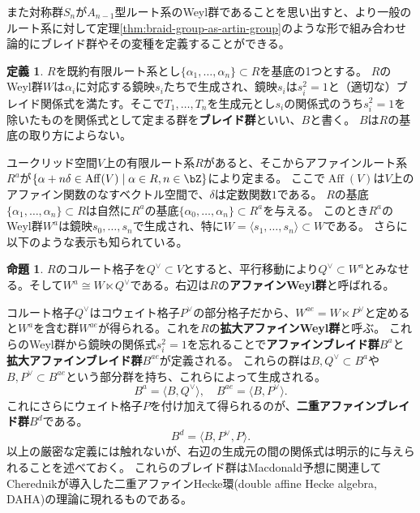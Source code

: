 \documentclass[uplatex,11pt,a4paper,dvipdfmx]{jsarticle}
\numberwithin{equation}{section}
\numberwithin{figure}{section}
\theoremstyle{definition}
\newtheorem{proposition}[theorem]{命題}
\newtheorem{definition}[theorem]{定義}
\DeclareMathOperator{\Aff}{Aff}
\begin{document}
また対称群$S_n$が$A_{n-1}$型ルート系のWeyl群であることを思い出すと、より一般のルート系に対して定理\ref{thm:braid-group-as-artin-group}のような形で組み合わせ論的にブレイド群やその変種を定義することができる。
\begin{definition}
    $R$を既約有限ルート系とし$\{\alpha_1, \dots, \alpha_n\} \subset R$を基底の1つとする。
    $R$のWeyl群$W$は$\alpha_i$に対応する鏡映$s_i$たちで生成され、鏡映$s_i$は$s_i^2=1$と（適切な）ブレイド関係式を満たす。そこで$T_1, \dots, T_n$を生成元とし$s_i$の関係式のうち$s_i^2=1$を除いたものを関係式として定まる群を\textbf{ブレイド群}といい、$B$と書く。
    $B$は$R$の基底の取り方によらない。
\end{definition}
ユークリッド空間$V$上の有限ルート系$R$があると、そこからアファインルート系$R^{a}$が$\{\alpha + n \delta \in \Aff(V) \mid \alpha \in R, n \in \bZ\}$により定まる。
ここで$\Aff(V)$は$V$上のアファイン関数のなすベクトル空間で、$\delta$は定数関数$1$である。
$R$の基底$\{\alpha_1, \dots, \alpha_n\} \subset R$は自然に$R^{a}$の基底$\{\alpha_0, \dots, \alpha_n\} \subset R^{a}$を与える。
このとき$R^{a}$のWeyl群$W^{a}$は鏡映$s_0, \dots, s_n$で生成され、特に$W = \langle s_1, \dots, s_n\rangle \subset W$である。
さらに以下のような表示も知られている。
\begin{proposition}
    $R$のコルート格子を$Q^\vee \subset V$とすると、平行移動により$Q^\vee \subset W^{a}$とみなせる。そして$W^{a} \cong W \ltimes Q^\vee$である。右辺は$R$の\textbf{アファインWeyl群}と呼ばれる。
\end{proposition}
コルート格子$Q^\vee$はコウェイト格子$P^\vee$の部分格子だから、$W^{ae} = W \ltimes P^\vee$と定めると$W^{a}$を含む群$W^{ae}$が得られる。これを$R$の\textbf{拡大アファインWeyl群}と呼ぶ。
これらのWeyl群から鏡映の関係式$s_i^2 = 1$を忘れることで\textbf{アファインブレイド群}$B^{a}$と\textbf{拡大アファインブレイド群}$B^{ae}$が定義される。
これらの群は$B, Q^\vee \subset B^{a}$や$B, P^\vee \subset B^{ae}$という部分群を持ち、これらによって生成される。
\begin{equation}
    B^{a} = \langle B, Q^\vee \rangle, \quad B^{ae} = \langle B, P^\vee \rangle.
\end{equation}
これにさらにウェイト格子$P$を付け加えて得られるのが、\textbf{二重アファインブレイド群}$B^{d}$である。
\begin{equation}
    B^{d} = \langle B, P^\vee, P\rangle.
\end{equation}
以上の厳密な定義には触れないが、右辺の生成元の間の関係式は明示的に与えられることを述べておく。
これらのブレイド群はMacdonald予想に関連してCherednikが導入した二重アファインHecke環(double affine Hecke algebra, DAHA)の理論に現れるものである。
\end{document}
